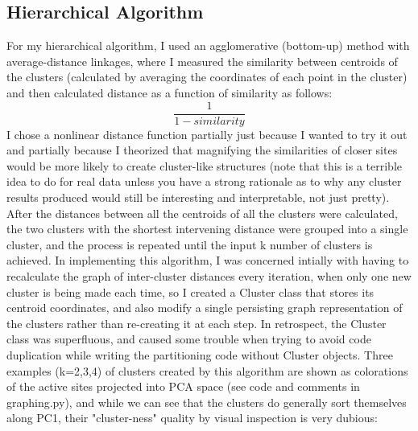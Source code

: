 \documentclass{article}
\begin{document}
\subsection{Hierarchical Algorithm}
For my hierarchical algorithm, I used an agglomerative (bottom-up) method with average-distance linkages, where I measured the similarity between centroids of the clusters (calculated by averaging the coordinates of each point in the cluster) and then calculated distance as a function of similarity as follows: $$\frac{1}{1-similarity}$$ 
I chose a nonlinear distance function partially just because I wanted to try it out and partially because I theorized that magnifying the similarities of closer sites would be more likely to create cluster-like structures (note that this is a terrible idea to do for real data unless you have a strong rationale as to why any cluster results produced would still be interesting and interpretable, not just pretty). After the distances between all the centroids of all the clusters were calculated, the two clusters with the shortest intervening distance were grouped into a single cluster, and the process is repeated until the input k number of clusters is achieved. In implementing this algorithm, I was concerned intially with having to recalculate the graph of inter-cluster distances every iteration, when only one new cluster is being made each time, so I created a Cluster class that stores its centroid coordinates, and also modify a single persisting graph representation of the clusters rather than re-creating it at each step. In retrospect, the Cluster class was superfluous, and caused some trouble when trying to avoid code duplication while writing the partitioning code without Cluster objects. Three examples (k=2,3,4) of clusters created by this algorithm are shown as colorations of the active sites projected into PCA space (see code and comments in graphing.py), and while we can see that the clusters do generally sort themselves along PC1, their "cluster-ness" quality by visual inspection is very dubious:
\end{document}
